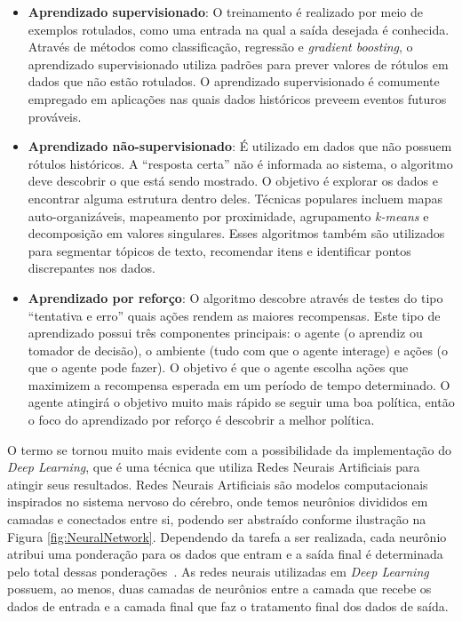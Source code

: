 \documentclass[Portugues,Final]{ic-tese-v3}
\begin{document}
\begin{itemize}
\item \textbf{Aprendizado supervisionado}: O treinamento é realizado por meio de exemplos rotulados, como uma entrada na qual a saída desejada é conhecida. Através de métodos como classificação, regressão e \textit{gradient boosting}, o aprendizado supervisionado utiliza padrões para prever valores de rótulos em dados que não estão rotulados. O aprendizado supervisionado é comumente empregado em aplicações nas quais dados históricos preveem eventos futuros prováveis.
\item \textbf{Aprendizado não-supervisionado}: É utilizado em dados que não possuem rótulos históricos. A “resposta certa” não é informada ao sistema, o algoritmo deve descobrir o que está sendo mostrado. O objetivo é explorar os dados e encontrar alguma estrutura dentro deles. Técnicas populares incluem mapas auto-organizáveis, mapeamento por proximidade, agrupamento \textit{k-means} e decomposição em valores singulares. Esses algoritmos também são utilizados para segmentar tópicos de texto, recomendar itens e identificar pontos discrepantes nos dados.
\item \textbf{Aprendizado por reforço}: O algoritmo descobre através de testes do tipo “tentativa e erro” quais ações rendem as maiores recompensas. Este tipo de aprendizado possui três componentes principais: o agente (o aprendiz ou tomador de decisão), o ambiente (tudo com que o agente interage) e ações (o que o agente pode fazer). O objetivo é que o agente escolha ações que maximizem a recompensa esperada em um período de tempo determinado. O agente atingirá o objetivo muito mais rápido se seguir uma boa política, então o foco do aprendizado por reforço é descobrir a melhor política.
\end{itemize}

O termo se tornou muito mais evidente com a possibilidade da implementação do \textit{Deep Learning}, que é uma técnica que utiliza Redes Neurais Artificiais para atingir seus resultados. Redes Neurais Artificiais são modelos computacionais inspirados no sistema nervoso do cérebro, onde temos neurônios divididos em camadas e conectados entre si, podendo ser abstraído conforme ilustração na Figura \ref{fig:NeuralNetwork}. Dependendo da tarefa a ser realizada, cada neurônio atribui uma ponderação para os dados que entram e a saída final é determinada pelo total dessas ponderações~\cite{Copeland_2016}. As redes neurais utilizadas em \textit{Deep Learning} possuem, ao menos, duas camadas de neurônios entre a camada que recebe os dados de entrada e a camada final que faz o tratamento final dos dados de saída.
\end{document}
